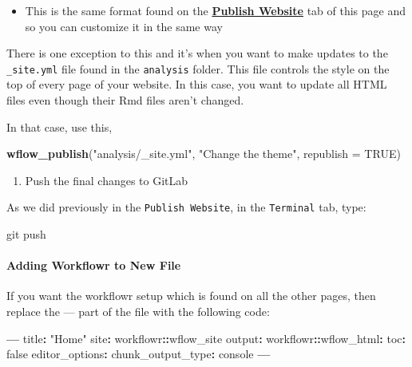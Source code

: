 \documentclass[openany]{article}
\newenvironment{Shaded}{\begin{snugshade}}{\end{snugshade}}
\newcommand{\DataTypeTok}[1]{\textcolor[rgb]{0.13,0.29,0.53}{#1}}
\newcommand{\KeywordTok}[1]{\textcolor[rgb]{0.13,0.29,0.53}{\textbf{#1}}}
\newcommand{\NormalTok}[1]{#1}
\newcommand{\OperatorTok}[1]{\textcolor[rgb]{0.81,0.36,0.00}{\textbf{#1}}}
\newcommand{\OtherTok}[1]{\textcolor[rgb]{0.56,0.35,0.01}{#1}}
\newcommand{\StringTok}[1]{\textcolor[rgb]{0.31,0.60,0.02}{#1}}
\providecommand{\tightlist}{%
  \setlength{\itemsep}{0pt}\setlength{\parskip}{0pt}}
\let\oldparagraph\paragraph
\renewcommand{\paragraph}[1]{\oldparagraph{#1}\mbox{}}
\begin{document}
\begin{itemize}
\tightlist
\item
  This is the same format found on the \protect\hyperlink{publish-website}{\textbf{Publish Website}} tab of this page and so you can customize it in the same way
\end{itemize}

There is one exception to this and it's when you want to make updates to the \texttt{\_site.yml} file found in the \texttt{analysis} folder. This file controls the style on the top of every page of your website. In this case, you want to update all HTML files even though their Rmd files aren't changed.

In that case, use this,

\begin{Shaded}
\begin{Highlighting}[]
\KeywordTok{wflow_publish}\NormalTok{(}\StringTok{"analysis/_site.yml"}\NormalTok{, }
    \StringTok{"Change the theme"}\NormalTok{, }\DataTypeTok{republish =} \OtherTok{TRUE}\NormalTok{)}
\end{Highlighting}
\end{Shaded}

\begin{enumerate}
\def\labelenumi{\arabic{enumi}.}
\setcounter{enumi}{2}
\tightlist
\item
  Push the final changes to GitLab
\end{enumerate}

As we did previously in the \texttt{Publish\ Website}, in the \texttt{Terminal} tab, type:

\begin{Shaded}
\begin{Highlighting}[]
\NormalTok{git push}
\end{Highlighting}
\end{Shaded}

\hypertarget{adding-workflowr-to-new-file}{%
\paragraph{Adding Workflowr to New File}\label{adding-workflowr-to-new-file}}

If you want the workflowr setup which is found on all the other pages, then replace the --- part of the file with the following code:

\begin{Shaded}
\begin{Highlighting}[]
            \OperatorTok{---}
\StringTok{            }\NormalTok{title}\OperatorTok{:}\StringTok{ "Home"}
\NormalTok{            site}\OperatorTok{:}\StringTok{ }\NormalTok{workflowr}\OperatorTok{::}\NormalTok{wflow_site}
\NormalTok{            output}\OperatorTok{:}
\StringTok{              }\NormalTok{workflowr}\OperatorTok{::}\NormalTok{wflow_html}\OperatorTok{:}
\StringTok{                }\NormalTok{toc}\OperatorTok{:}\StringTok{ }\NormalTok{false}
\NormalTok{            editor_options}\OperatorTok{:}
\StringTok{              }\NormalTok{chunk_output_type}\OperatorTok{:}\StringTok{ }\NormalTok{console}
            \OperatorTok{---}
\end{Highlighting}
\end{Shaded}
\end{document}
